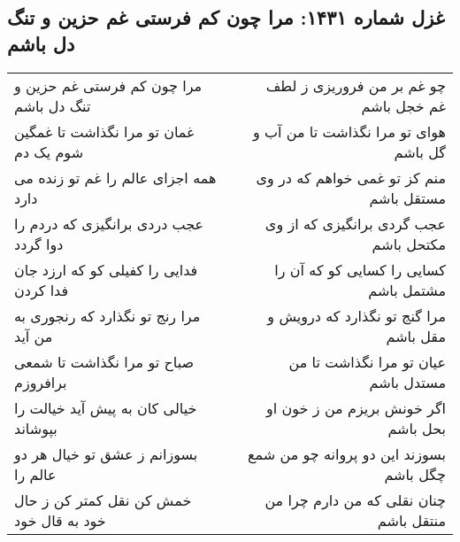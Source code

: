 \begin{center}
\section*{غزل شماره ۱۴۳۱: مرا چون کم فرستی غم حزین و تنگ دل باشم}
\label{sec:1431}
\begin{longtable}{l p{0.5cm} r}
مرا چون کم فرستی غم حزین و تنگ دل باشم
&&
چو غم بر من فروریزی ز لطف غم خجل باشم
\\
غمان تو مرا نگذاشت تا غمگین شوم یک دم
&&
هوای تو مرا نگذاشت تا من آب و گل باشم
\\
همه اجزای عالم را غم تو زنده می دارد
&&
منم کز تو غمی خواهم که در وی مستقل باشم
\\
عجب دردی برانگیزی که دردم را دوا گردد
&&
عجب گردی برانگیزی که از وی مکتحل باشم
\\
فدایی را کفیلی کو که ارزد جان فدا کردن
&&
کسایی را کسایی کو که آن را مشتمل باشم
\\
مرا رنج تو نگذارد که رنجوری به من آید
&&
مرا گنج تو نگذارد که درویش و مقل باشم
\\
صباح تو مرا نگذاشت تا شمعی برافروزم
&&
عیان تو مرا نگذاشت تا من مستدل باشم
\\
خیالی کان به پیش آید خیالت را بپوشاند
&&
اگر خونش بریزم من ز خون او بحل باشم
\\
بسوزانم ز عشق تو خیال هر دو عالم را
&&
بسوزند این دو پروانه چو من شمع چگل باشم
\\
خمش کن نقل کمتر کن ز حال خود به قال خود
&&
چنان نقلی که من دارم چرا من منتقل باشم
\\
\end{longtable}
\end{center}

